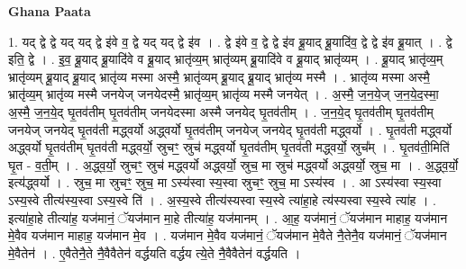 \documentclass[17pt]{extarticle}
\begin{document}
\textbf{Ghana Paata } \newline

1. यद् द्वे द्वे यद् यद् द्वे इ॑वे व॒ द्वे यद् यद् द्वे इ॑व । . द्वे इ॑वे व॒ द्वे द्वे इ॑व ब्रू॒याद् ब्रू॒यादि॑व॒ द्वे द्वे इ॑व ब्रू॒यात् । . द्वे इति॒ द्वे । . इ॒व॒ ब्रू॒याद् ब्रू॒यादि॑वे व ब्रू॒याद् भ्रातृ॑व्य॒म् भ्रातृ॑व्यम् ब्रू॒यादि॑वे व ब्रू॒याद् भ्रातृ॑व्यम् । . ब्रू॒याद् भ्रातृ॑व्य॒म् भ्रातृ॑व्यम् ब्रू॒याद् ब्रू॒याद् भ्रातृ॑व्य मस्मा अस्मै॒ भ्रातृ॑व्यम् ब्रू॒याद् ब्रू॒याद् भ्रातृ॑व्य मस्मै । . भ्रातृ॑व्य मस्मा अस्मै॒ भ्रातृ॑व्य॒म् भ्रातृ॑व्य मस्मै जनयेज् जनयेदस्मै॒ भ्रातृ॑व्य॒म् भ्रातृ॑व्य मस्मै जनयेत् । . अ॒स्मै॒ ज॒न॒ये॒ज् ज॒न॒ये॒द॒स्मा॒ अ॒स्मै॒ ज॒न॒ये॒द् घृ॒तव॑तीम् घृ॒तव॑तीम् जनयेदस्मा अस्मै जनयेद् घृ॒तव॑तीम् । . ज॒न॒ये॒द् घृ॒तव॑तीम् घृ॒तव॑तीम् जनयेज् जनयेद् घृ॒तव॑ती मद्ध्वर्यो अद्ध्वर्यो घृ॒तव॑तीम् जनयेज् जनयेद् घृ॒तव॑ती मद्ध्वर्यो । . घृ॒तव॑ती मद्ध्वर्यो अद्ध्वर्यो घृ॒तव॑तीम् घृ॒तव॑ती मद्ध्वर्यो॒ स्रुचꣳ॒॒ स्रुच॑ मद्ध्वर्यो घृ॒तव॑तीम् घृ॒तव॑ती मद्ध्वर्यो॒ स्रुच᳚म् । . घृ॒तव॑ती॒मिति॑ घृ॒त - व॒ती॒म् । . अ॒द्ध्व॒र्यो॒ स्रुचꣳ॒॒ स्रुच॑ मद्ध्वर्यो अद्ध्वर्यो॒ स्रुच॒ मा स्रुच॑ मद्ध्वर्यो अद्ध्वर्यो॒ स्रुच॒ मा । . अ॒द्ध्व॒र्यो॒ इत्य॑द्ध्वर्यो । . स्रुच॒ मा स्रुचꣳ॒॒ स्रुच॒ मा ऽस्य॑स्वा स्य॒स्वा स्रुचꣳ॒॒ स्रुच॒ मा ऽस्य॑स्व । . आ ऽस्य॑स्वा स्य॒स्वा ऽस्य॒स्वे तीत्य॑स्य॒स्वा ऽस्य॒स्वे ति॑ । . अ॒स्य॒स्वे तीत्य॑स्यस्वा स्य॒स्वे त्या॑हा॒हे त्य॑स्यस्वा स्य॒स्वे त्या॑ह । . इत्या॑हा॒हे तीत्या॑ह॒ यज॑मानं॒ ॅयज॑मान मा॒हे तीत्या॑ह॒ यज॑मानम् । . आ॒ह॒ यज॑मानं॒ ॅयज॑मान माहाह॒ यज॑मान मे॒वैव यज॑मान माहाह॒ यज॑मान मे॒व । . यज॑मान मे॒वैव यज॑मानं॒ ॅयज॑मान मे॒वैते नै॒तेनै॒व यज॑मानं॒ ॅयज॑मान मे॒वैतेन॑ । . ए॒वैतेनै॒ते नै॒वैवैतेन॑ वर्द्धयति वर्द्धय त्ये॒ते नै॒वैवैतेन॑ वर्द्धयति । \newline
\end{document}
